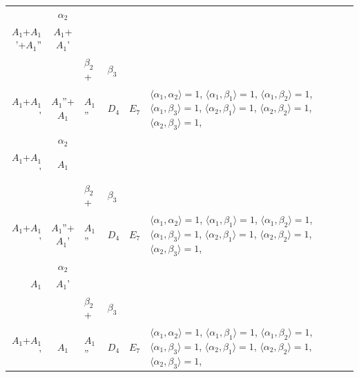 \documentclass[12pt]{report}
\begin{document}
\begin{appendix}
{\begin{longtable}{rcl p{1cm}p{1cm}p{3cm} }
\\
\begin{tabular}{cc}$\alpha_1$+ & $\alpha_2$\\\tiny{ $A_1$+$A_1$'+$A_1$'' } & \tiny{ $A_1$+$A_1$' }\end{tabular} &\begin{tabular}{c} = \\~ \end{tabular} & \begin{tabular}{ccc}$\beta_1$+ & $\beta_2$+ & $\beta_3$\\\tiny{ $A_1$+$A_1$' } & \tiny{ $A_1$''+$A_1$ } & \tiny{ $A_1$'' }\end{tabular} & $D_4$ & $E_7$ & $\langle\alpha_1, \alpha_2\rangle=1$,  $\langle\alpha_1, \beta_1\rangle=1$, $\langle\alpha_1, \beta_2\rangle=1$, $\langle\alpha_1, \beta_3\rangle=1$, $\langle\alpha_2, \beta_1\rangle=1$, $\langle\alpha_2, \beta_2\rangle=1$, $\langle\alpha_2, \beta_3\rangle=1$, 
\\
\begin{tabular}{cc}$\alpha_1$+ & $\alpha_2$\\\tiny{ $A_1$+$A_1$' } & \tiny{ $A_1$ }\end{tabular} &\begin{tabular}{c} = \\~ \end{tabular} & \begin{tabular}{ccc}$\beta_1$+ & $\beta_2$+ & $\beta_3$\\\tiny{ $A_1$+$A_1$' } & \tiny{ $A_1$''+$A_1$' } & \tiny{ $A_1$'' }\end{tabular} & $D_4$ & $E_7$ & $\langle\alpha_1, \alpha_2\rangle=1$,  $\langle\alpha_1, \beta_1\rangle=1$, $\langle\alpha_1, \beta_2\rangle=1$, $\langle\alpha_1, \beta_3\rangle=1$, $\langle\alpha_2, \beta_1\rangle=1$, $\langle\alpha_2, \beta_2\rangle=1$, $\langle\alpha_2, \beta_3\rangle=1$, 
\\
\begin{tabular}{cc}$\alpha_1$+ & $\alpha_2$\\\tiny{ $A_1$ } & \tiny{ $A_1$' }\end{tabular} &\begin{tabular}{c} = \\~ \end{tabular} & \begin{tabular}{ccc}$\beta_1$+ & $\beta_2$+ & $\beta_3$\\\tiny{ $A_1$+$A_1$' } & \tiny{ $A_1$ } & \tiny{ $A_1$'' }\end{tabular} & $D_4$ & $E_7$ & $\langle\alpha_1, \alpha_2\rangle=1$,  $\langle\alpha_1, \beta_1\rangle=1$, $\langle\alpha_1, \beta_2\rangle=1$, $\langle\alpha_1, \beta_3\rangle=1$, $\langle\alpha_2, \beta_1\rangle=1$, $\langle\alpha_2, \beta_2\rangle=1$, $\langle\alpha_2, \beta_3\rangle=1$, 

\end{longtable}}
\end{appendix}
\end{document}
